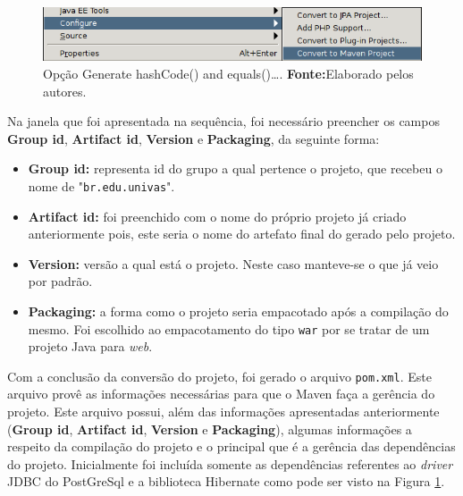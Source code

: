 	\begin{figure}[h!]
		\centerline{\includegraphics[scale=0.8]{./imagens/2_q_metodologico/4_procedimentos_resultados/43_webservice/432_desenvolvimento/desws18.png}}
		\caption[Opção Generate hashCode() and equals()\ldots]{Opção Generate
		hashCode() and equals()\ldots .
			\textbf{Fonte:}Elaborado pelos autores.}
		\label{fig:desws18}
	\end{figure}
	
	\par Na janela que foi apresentada na sequência, foi necessário preencher os
campos \textbf{Group id}, \textbf{Artifact id}, \textbf{Version} e
\textbf{Packaging}, da seguinte forma:

	\begin{itemize}
	  \item \textbf{Group id:} representa id do grupo a qual pertence o projeto,
	  que recebeu o nome de "\texttt{br.edu.univas}".
	  \item \textbf{Artifact id:} foi preenchido com o nome do próprio projeto já
	  criado anteriormente pois, este seria o nome do artefato final do gerado pelo
	  projeto.
	  \item \textbf{Version:} versão a qual está o projeto. Neste caso manteve-se
	  o que já veio por padrão.
	  \item \textbf{Packaging:} a forma como o projeto seria empacotado após a
	  compilação do mesmo. Foi escolhido ao empacotamento do tipo \texttt{war} por
	  se tratar de um projeto Java para \textit{web}.
	\end{itemize}
		
	\par Com a conclusão da conversão do projeto, foi gerado o arquivo
\texttt{pom.xml}. Este arquivo provê as informações necessárias para que o Maven
faça a gerência do projeto. Este arquivo possui, além das informações
apresentadas anteriormente (\textbf{Group id}, \textbf{Artifact id},
\textbf{Version} e \textbf{Packaging}), algumas informações a respeito da
compilação do projeto e o principal que é a gerência das dependências do
projeto. Inicialmente foi incluída somente as dependências referentes ao
\textit{driver} JDBC do PostGreSql e a biblioteca Hibernate como pode ser visto
na Figura \ref{fig:desws18}.
	
